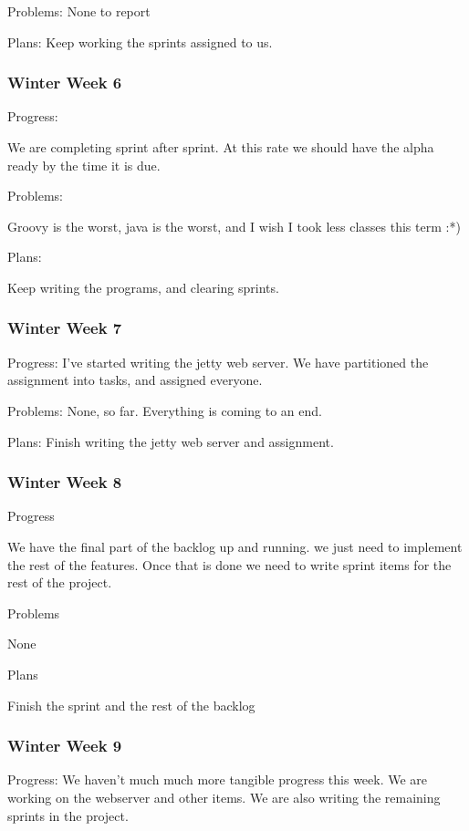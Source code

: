 \documentclass[onecolumn, draftclsnofoot,10pt, compsoc]{IEEEtran}
\begin{document}
Problems: None to report

Plans: Keep working the sprints assigned to us.

\subsubsection*{Winter Week 6}

Progress:

 We are completing sprint after sprint. At this rate we should have the alpha ready by the time it is due.

Problems:

Groovy is the worst, java is the worst, and I wish I took less classes this term :*)

Plans:

Keep writing the programs, and clearing sprints.

\subsubsection*{Winter Week 7}

Progress: I've started writing the jetty web server. We have partitioned the assignment into tasks, and assigned everyone. 

Problems: None, so far. Everything is coming to an end.

Plans: Finish writing the jetty web server and assignment.

\subsubsection*{Winter Week 8}

Progress

We have the final part of the backlog up and running. we just need to implement the rest of the features. Once that is done we need to write sprint items for the rest of the project.

Problems

None

Plans

Finish the sprint and the rest of the backlog

\subsubsection*{Winter Week 9}

Progress: We haven't much much more tangible progress this week. We are working on the webserver and other items. We are also writing the remaining sprints in the project.
\end{document}
